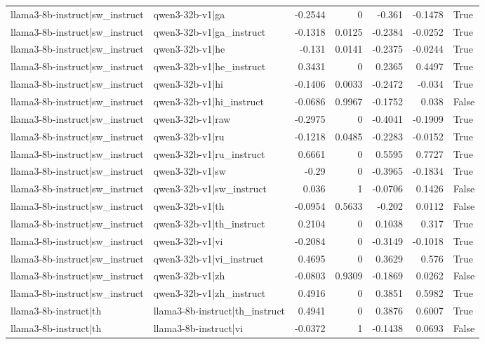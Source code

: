\begin{table}
\begin{tabular}{l l r r r r l}
llama3-8b-instruct|sw_instruct & qwen3-32b-v1|ga & -0.2544 & 0 & -0.361 & -0.1478 & True \\
llama3-8b-instruct|sw_instruct & qwen3-32b-v1|ga_instruct & -0.1318 & 0.0125 & -0.2384 & -0.0252 & True \\
llama3-8b-instruct|sw_instruct & qwen3-32b-v1|he & -0.131 & 0.0141 & -0.2375 & -0.0244 & True \\
llama3-8b-instruct|sw_instruct & qwen3-32b-v1|he_instruct & 0.3431 & 0 & 0.2365 & 0.4497 & True \\
llama3-8b-instruct|sw_instruct & qwen3-32b-v1|hi & -0.1406 & 0.0033 & -0.2472 & -0.034 & True \\
llama3-8b-instruct|sw_instruct & qwen3-32b-v1|hi_instruct & -0.0686 & 0.9967 & -0.1752 & 0.038 & False \\
llama3-8b-instruct|sw_instruct & qwen3-32b-v1|raw & -0.2975 & 0 & -0.4041 & -0.1909 & True \\
llama3-8b-instruct|sw_instruct & qwen3-32b-v1|ru & -0.1218 & 0.0485 & -0.2283 & -0.0152 & True \\
llama3-8b-instruct|sw_instruct & qwen3-32b-v1|ru_instruct & 0.6661 & 0 & 0.5595 & 0.7727 & True \\
llama3-8b-instruct|sw_instruct & qwen3-32b-v1|sw & -0.29 & 0 & -0.3965 & -0.1834 & True \\
llama3-8b-instruct|sw_instruct & qwen3-32b-v1|sw_instruct & 0.036 & 1 & -0.0706 & 0.1426 & False \\
llama3-8b-instruct|sw_instruct & qwen3-32b-v1|th & -0.0954 & 0.5633 & -0.202 & 0.0112 & False \\
llama3-8b-instruct|sw_instruct & qwen3-32b-v1|th_instruct & 0.2104 & 0 & 0.1038 & 0.317 & True \\
llama3-8b-instruct|sw_instruct & qwen3-32b-v1|vi & -0.2084 & 0 & -0.3149 & -0.1018 & True \\
llama3-8b-instruct|sw_instruct & qwen3-32b-v1|vi_instruct & 0.4695 & 0 & 0.3629 & 0.576 & True \\
llama3-8b-instruct|sw_instruct & qwen3-32b-v1|zh & -0.0803 & 0.9309 & -0.1869 & 0.0262 & False \\
llama3-8b-instruct|sw_instruct & qwen3-32b-v1|zh_instruct & 0.4916 & 0 & 0.3851 & 0.5982 & True \\
llama3-8b-instruct|th & llama3-8b-instruct|th_instruct & 0.4941 & 0 & 0.3876 & 0.6007 & True \\
llama3-8b-instruct|th & llama3-8b-instruct|vi & -0.0372 & 1 & -0.1438 & 0.0693 & False \\

\end{tabular}
\end{table}
